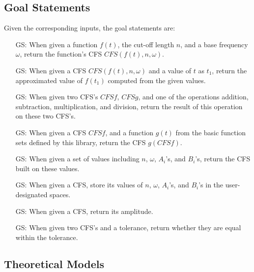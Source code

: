 \documentclass[12pt]{article}
\newcounter{goalnum} %
\begin{document}
\subsection{Goal Statements}

\noindent Given the corresponding inputs, the goal statements are:

\begin{itemize}

\item[GS\refstepcounter{goalnum}\thegoalnum \label{GS:ConvertFromFunc}:] When given a function $f(t)$, the cut-off length $n$, and a base frequency $\omega$, return the function's CFS $\mathit{CFS}(f(t), n, \omega)$.
\item[GS\refstepcounter{goalnum}\thegoalnum \label{GS:FuncValue}:] When given a CFS $\mathit{CFS}(f(t), n, \omega)$ and a value of $t$ as $t_1$, return the approximated value of $f(t_1)$ computed from the given values.
\item[GS\refstepcounter{goalnum}\thegoalnum \label{GS:Operation}:] When given two CFS's $\mathit{CFSf}$, $\mathit{CFSg}$, and one of the operations addition, subtraction, multiplication, and division, return the result of this operation on these two CFS's.
\item[GS\refstepcounter{goalnum}\thegoalnum \label{GS:Function}:] When given a CFS $\mathit{CFSf}$, and a function $g(t)$ from the basic function sets defined by this library, return the CFS $g(CFSf)$. 
\item[GS\refstepcounter{goalnum}\thegoalnum \label{GS:ConvertFromOther}:] When given a set of values including $n$, $\omega$, $A_i$'s, and $B_i$'s, return the CFS built on these values.
\item[GS\refstepcounter{goalnum}\thegoalnum \label{GS:ConvertToOther}:] When given a CFS, store its values of $n$, $\omega$, $A_i$'s, and $B_i$'s in the user-designated spaces.
\item[GS\refstepcounter{goalnum}\thegoalnum \label{GS:Amp}:] When given a CFS, return its amplitude.
\item[GS\refstepcounter{goalnum}\thegoalnum \label{GS:ToleratedEquality}:] When given two CFS's and a tolerance, return whether they are equal within the tolerance.
\end{itemize}

\subsection{Theoretical Models} \label{sec_theoretical}
\end{document}
